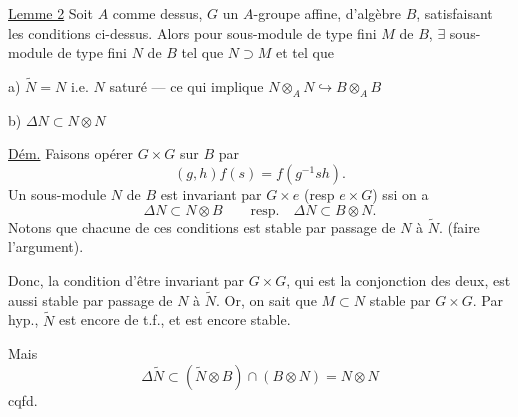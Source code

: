\uline{Lemme 2} Soit  $A$ comme dessus, $G$ un $A$-groupe affine, d'algèbre $B$, satisfaisant les conditions ci-dessus. Alors pour  sous-module de type fini $M$ de $B$, $\exists$ sous-module de type fini $N$ de $B$ tel que $N\supset M$ et tel que

a) $\tilde N=N$ i.e. $N$ saturé --- ce qui implique $N\otimes_A N\hookrightarrow B\otimes_A B$

b) $\Delta N\subset N\otimes N$

\uline{Dém.} Faisons opérer $G\times G$ \deleted{$\unsure{\longrightarrow}$} sur $B$ par
\[
(g,h)f(s)=f(g^{-1}sh).
\]
 Un sous-module $N$ de $B$ est invariant par $G\times e$ (resp $e\times G$)  ssi on a
\[
\Delta N\subset N\otimes B\qquad\text{resp.}\quad\Delta N\subset B\otimes N.
\]
Notons que  chacune de ces conditions est stable par passage de $N$ à $\tilde N$. (faire l'argument).

Donc, la condition d'être invariant par $G\times G$, qui est la conjonction des deux, est aussi stable par passage de $N$ à $\tilde N$. Or, on sait que $M\subset N$  stable par $G\times G$. Par hyp., $\tilde N$ est encore de t.f.,  et est encore stable. 

Mais 
\[
\Delta\tilde N\subset(\tilde N\otimes B)\cap(B\otimes N)=N\otimes N
\]
cqfd.
